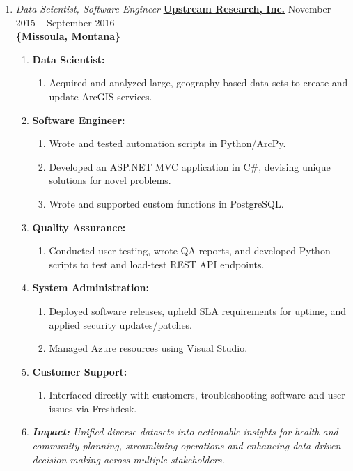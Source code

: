 \documentclass[oneside]{article}%
\begin{document}
\begin{enumerate}[]
	\item \textit{Data Scientist, Software Engineer} \textbf{\href{https://upstreamresearch.com}{Upstream Research, Inc.}} \hfill November 2015 -- September 2016\\
	\textbf{\{Missoula, Montana\}}
	\begin{enumerate}[]
		\item \textbf{Data Scientist:}
			\begin{enumerate}[-]
				\item Acquired and analyzed large, geography-based data sets to create and update ArcGIS services.
			\end{enumerate}
		\item \textbf{Software Engineer:}
			\begin{enumerate}[-]
				\item Wrote and tested automation scripts in Python/ArcPy.
				\item Developed an ASP.NET MVC application in C\#, devising unique solutions for novel problems.
				\item Wrote and supported custom functions in PostgreSQL.
			\end{enumerate}
		\item \textbf{Quality Assurance:}
			\begin{enumerate}[-]
				\item Conducted user-testing, wrote QA reports, and developed Python scripts to test and load-test REST API endpoints.
			\end{enumerate}
		\item \textbf{System Administration:}
			\begin{enumerate}[-]
				\item Deployed software releases, upheld SLA requirements for uptime, and applied security updates/patches.
				\item Managed Azure resources using Visual Studio.
			\end{enumerate}
		\item \textbf{Customer Support:}
			\begin{enumerate}[-]
				\item Interfaced directly with customers, troubleshooting software and user issues via Freshdesk.
			\end{enumerate}
		\item \textit{\textbf{Impact:} Unified diverse datasets into actionable insights for health and community planning, streamlining operations and enhancing data-driven decision-making across multiple stakeholders.}

\end{enumerate}
\end{enumerate}
\end{document}
